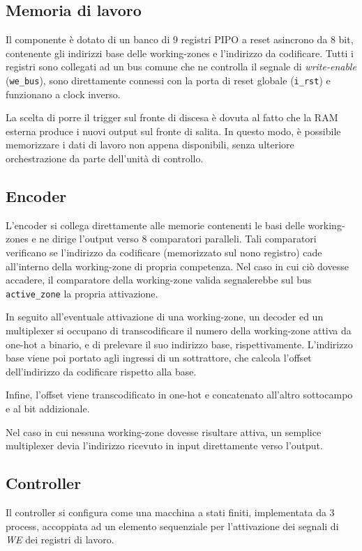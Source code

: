 \documentclass[11pt,a4paper]{article}
\begin{document}
\subsection{Memoria di lavoro}
Il componente è dotato di un banco di 9 registri PIPO a reset asincrono da 8 bit, contenente gli indirizzi base delle working-zones e l'indirizzo da
codificare. Tutti i registri sono collegati ad un bus comune che ne controlla il segnale di \emph{write-enable} (\lstinline{we_bus}), sono direttamente
connessi con la porta di reset globale (\lstinline{i_rst}) e funzionano a clock inverso.

La scelta di porre il trigger sul fronte di discesa è dovuta al fatto che la RAM esterna produce i nuovi output sul fronte di salita. In questo modo, è
possibile memorizzare i dati di lavoro non appena disponibili, senza ulteriore orchestrazione da parte dell'unità di controllo.

\subsection{Encoder}
L'encoder si collega direttamente alle memorie contenenti le basi delle working-zones e ne dirige l'output verso 8 comparatori paralleli. Tali comparatori
verificano se l'indirizzo da codificare (memorizzato sul nono registro) cade all'interno della working-zone di propria competenza. Nel caso in cui ciò
dovesse accadere, il comparatore della working-zone valida segnalerebbe sul bus \lstinline{active_zone} la propria attivazione.

In seguito all'eventuale attivazione di una working-zone, un decoder ed un multiplexer si occupano di transcodificare il numero della working-zone attiva
da one-hot a binario, e di prelevare il suo indirizzo base, rispettivamente. L'indirizzo base viene poi portato agli ingressi di un sottrattore, che
calcola l'offset dell'indirizzo da codificare rispetto alla base.

Infine, l'offset viene transcodificato in one-hot e concatenato all'altro sottocampo e al bit addizionale.

Nel caso in cui nessuna working-zone dovesse risultare attiva, un semplice multiplexer devia l'indirizzo ricevuto in input direttamente verso l'output.

\subsection{Controller}
Il controller si configura come una macchina a stati finiti, implementata da 3 process, accoppiata ad un elemento sequenziale per l'attivazione dei
segnali di \emph{WE} dei registri di lavoro.
\end{document}
